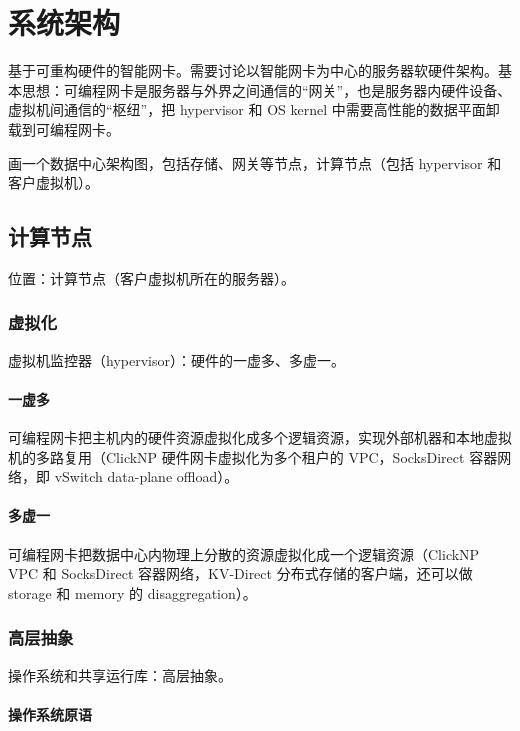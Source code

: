 \chapter{系统架构}

基于可重构硬件的智能网卡。需要讨论以智能网卡为中心的服务器软硬件架构。基本思想：可编程网卡是服务器与外界之间通信的“网关”，也是服务器内硬件设备、虚拟机间通信的“枢纽”，把 hypervisor 和 OS kernel 中需要高性能的数据平面卸载到可编程网卡。

画一个数据中心架构图，包括存储、网关等节点，计算节点（包括 hypervisor 和客户虚拟机）。

\section{计算节点}

位置：计算节点（客户虚拟机所在的服务器）。

\subsection{虚拟化}

虚拟机监控器（hypervisor）：硬件的一虚多、多虚一。

\subsubsection{一虚多}

可编程网卡把主机内的硬件资源虚拟化成多个逻辑资源，实现外部机器和本地虚拟机的多路复用（ClickNP 硬件网卡虚拟化为多个租户的 VPC，SocksDirect 容器网络，即 vSwitch data-plane offload）。

\subsubsection{多虚一}

可编程网卡把数据中心内物理上分散的资源虚拟化成一个逻辑资源（ClickNP VPC 和 SocksDirect 容器网络，KV-Direct 分布式存储的客户端，还可以做 storage 和 memory 的 disaggregation）。

\subsection{高层抽象}

操作系统和共享运行库：高层抽象。

\subsubsection{操作系统原语}

